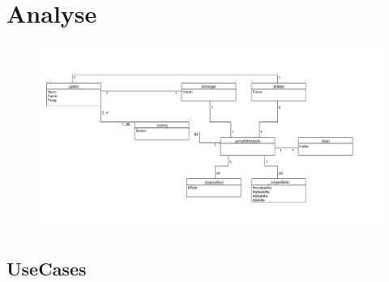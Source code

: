 \section{Analyse}
\begin{figure}[h]
	\begin{center}
		\includegraphics[scale=0.9]{fig/dtu/domainmodel.jpg}
	\end{center}
\end{figure}
	\subsection{UseCases}